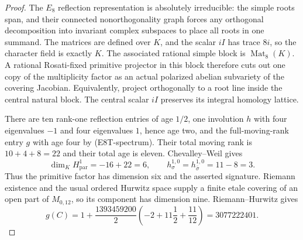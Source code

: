 \begin{proof}
The $E_8$ reflection representation is absolutely irreducible: the
simple roots span, and their connected nonorthogonality graph forces
any orthogonal decomposition into invariant complex subspaces to
place all roots in one summand. The matrices are defined over $K$,
and the scalar $iI$ has trace $8i$, so the character field is exactly
$K$. The associated rational simple block is $\operatorname{Mat}_8(K)$.
A rational Rosati-fixed primitive projector in this block therefore
cuts out one copy of the multiplicity factor as an actual polarized
abelian subvariety of the covering Jacobian. Equivalently, project
orthogonally to a root line inside the central natural block. The
central scalar $iI$ preserves its integral homology lattice.

There are ten rank-one reflection entries of age $1/2$, one involution
$h$ with four eigenvalues $-1$ and four eigenvalues $1$, hence age two,
and the full-moving-rank entry $g$ with age four by
(E8T-spectrum). Their total moving rank is $10+4+8=22$ and their
total age is eleven. Chevalley--Weil gives
\[
\dim_K H^1_{\mathrm{par}}=-16+22=6,\qquad
h^{1,0}_{\sigma}=h^{1,0}_{\bar\sigma}=11-8=3.
\]
Thus the primitive factor has dimension six and the asserted
signature. Riemann existence and the usual ordered Hurwitz space
supply a finite etale covering of an open part of $M_{0,12}$, so its
component has dimension nine. Riemann--Hurwitz gives
\[
g(C)=1+\frac{1393459200}{2}
\left(-2+11\frac12+\frac{11}{12}\right)=3077222401.
\]


\end{proof}
